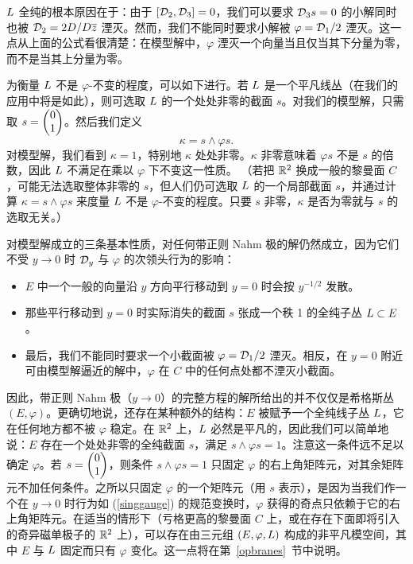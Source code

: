 ${ L}$ 全纯的根本原因在于：由于 $[{\mathcal D}_2,{\mathcal D}_3]=0$，我们可以要求 ${\mathcal D}_3s=0$ 的小解同时也被 ${\mathcal D}_2=2D/D\overline z$ 湮灭。然而，我们不能同时要求小解被 $\varphi={\mathcal D}_1/2$ 湮灭。这一点从上面的公式看很清楚：在模型解中，$\varphi$ 湮灭一个向量当且仅当其下分量为零，而不是当其上分量为零。

为衡量 ${ L}$ 不是 $\varphi$-不变的程度，可以如下进行。若 ${ L}$ 是一个平凡线丛（在我们的应用中将是如此），则可选取 ${ L}$ 的一个处处非零的截面 $s$。对我们的模型解，只需取 $s=\begin{pmatrix} 0 \cr 1\end{pmatrix}$。然后我们定义
\begin{equation}\label{smallexp}  \kappa= s\wedge \varphi s.  \end{equation}
对模型解，我们看到 $\kappa=1$，特别地
$\kappa$ 处处非零。$\kappa$ 非零意味着 $\varphi s $ 不是 $s$ 的倍数，因此 ${ L}$ 不满足在乘以 $\varphi$ 下不变这一性质。
（若把 ${\mathbb R}^2$ 换成一般的黎曼面 $C$，可能无法选取整体非零的 $s$，但人们仍可选取 ${ L}$ 的一个局部截面 $s$，并通过计算 $\kappa=s\wedge \varphi s$ 来度量 ${ L}$ 不是
$\varphi$-不变的程度。只要 $s$ 非零，$\kappa$ 是否为零就与 $s$ 的选取无关。）

对模型解成立的三条基本性质，对任何带正则 Nahm 极的解仍然成立，因为它们不受 $y \to 0$ 时 ${\mathcal D}_y$ 与 $\varphi$ 的次领头行为的影响：
\begin{itemize} \item $E$ 中一个一般的向量沿 $y$ 方向平行移动到
$y=0$ 时会按 $y^{-1/2}$ 发散。 \item  那些平行移动到 $y=0$ 时实际消失的截面 $s$ 张成一个秩 1 的全纯子丛  ${ L}\subset E$。  \item
最后，我们不能同时要求一个小截面被 $\varphi={\mathcal D}_1/2$ 湮灭。相反，在 $y=0$ 附近可由模型解逼近的解中，$\varphi$ 在 $C$ 中的任何点处都不湮灭小截面。\end{itemize}

因此，带正则 Nahm 极（$y\to 0$）的完整方程的解所给出的并不仅仅是希格斯丛 $(E,\varphi)$。更确切地说，还存在某种额外的结构：$E$ 被赋予一个全纯线子丛 ${ L}$，它在任何地方都不被 $\varphi$ 稳定。在 ${\mathbb R}^2$ 上，${ L}$ 必然是平凡的，因此我们可以简单地说：$E$ 存在一个处处非零的全纯截面 $s$，满足 $s \wedge \varphi s =1$。注意这一条件远不足以确定 $\varphi$。若 $s=\begin{pmatrix}0\cr 1\end{pmatrix}$，则条件 $s\wedge \varphi s=1$ 只固定 $\varphi$ 的右上角矩阵元，对其余矩阵元不加任何条件。之所以只固定 $\varphi$ 的一个矩阵元（用 $s$ 表示），是因为当我们作一个在 $y\to 0$ 时行为如 (\ref{singgauge}) 的规范变换时，$\varphi$ 获得的奇点只依赖于它的右上角矩阵元。在适当的情形下（亏格更高的黎曼面 $C$ 上，或在存在下面即将引入的奇异磁单极子的 ${\mathbb R}^2$ 上），可以存在由三元组 $(E,\varphi,{ L})$ 构成的非平凡模空间，其中 $E$ 与 ${ L}$ 固定而只有 $\varphi$ 变化。这一点将在第~\ref{opbranes}~节中说明。


